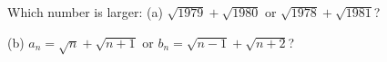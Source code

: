 Which number is larger: (a) $\sqrt{1979} + \sqrt{1980}$ or $\sqrt{1978} + \sqrt{1981}$?

(b) $a_n = \sqrt{n} + \sqrt{n + 1}$ or $b_n = \sqrt{n - 1} + \sqrt{n + 2}$?

